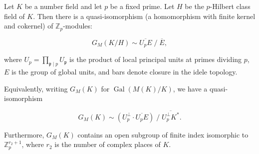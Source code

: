 Let $K$ be a number field and let $p$ be a fixed prime. Let $H$ be the $p$-Hilbert class field of $K$. Then there is a quasi-isomorphism (a homomorphism with finite kernel and cokernel) of $\mathbb{Z}_p$-modules:

$$G_M(K/H) \sim \overline{U_p E} \;/\; \overline{E},$$

where $U_p = \prod_{\mathfrak{p} \mid p} U_\mathfrak{p}$ is the product of local principal units at primes dividing $p$, $E$ is the group of global units, and bars denote closure in the idele topology.

Equivalently, writing $G_M(K)$ for $\operatorname{Gal}(M(K)/K)$, we have a quasi-isomorphism

$$G_M(K) \sim (U_p^\perp \cdot \overline{U_p E}) \;/\; \overline{U_p^\perp K^*}.$$

Furthermore, $G_M(K)$ contains an open subgroup of finite index isomorphic to $\mathbb{Z}_p^{r_2+1}$, where $r_2$ is the number of complex places of $K$.
